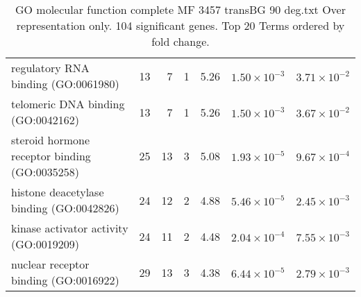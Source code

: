 \begin{table}[ht]
\begin{adjustbox}{width=\textwidth}
\begin{tabular}{lrrrlrr}
  regulatory RNA binding (GO:0061980) & 13 & 7 & 1 & 5.26 & $1.50 \times 10^{-3}$ & $3.71 \times 10^{-2}$ \\ 
  telomeric DNA binding (GO:0042162) & 13 & 7 & 1 & 5.26 & $1.50 \times 10^{-3}$ & $3.67 \times 10^{-2}$ \\ 
  steroid hormone receptor binding (GO:0035258) & 25 & 13 & 3 & 5.08 & $1.93 \times 10^{-5}$ & $9.67 \times 10^{-4}$ \\ 
  histone deacetylase binding (GO:0042826) & 24 & 12 & 2 & 4.88 & $5.46 \times 10^{-5}$ & $2.45 \times 10^{-3}$ \\ 
  kinase activator activity (GO:0019209) & 24 & 11 & 2 & 4.48 & $2.04 \times 10^{-4}$ & $7.55 \times 10^{-3}$ \\ 
  nuclear receptor binding (GO:0016922) & 29 & 13 & 3 & 4.38 & $6.44 \times 10^{-5}$ & $2.79 \times 10^{-3}$ \\ 
   \hline
\end{tabular}
\end{adjustbox}
\caption{GO molecular function complete MF 3457 transBG 90 deg.txt Over representation only. 104 significant genes. Top 20 Terms ordered by fold change. } 
\label{tab:GO molecular function complete MF 3457 transBG 90 deg.txt Over representation only. 104 significant genes. Top 20 Terms ordered by fold change. }
\end{table}



